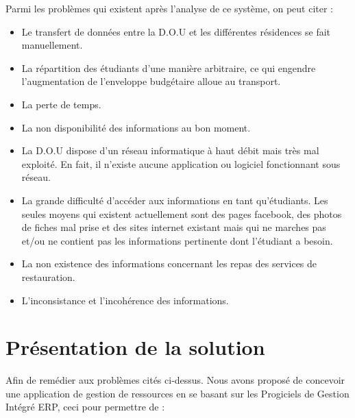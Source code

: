 Parmi les problèmes qui existent après l’analyse de ce système, on peut citer :
    \begin{itemize}
        \item Le transfert de données entre la \acs{D.O.U} et les différentes résidences se fait manuellement.
        \item La répartition des étudiants d’une manière arbitraire, ce qui engendre l’augmentation de l’enveloppe budgétaire alloue au transport.
        \item La perte de temps.
        \item La non disponibilité des informations au bon moment.
        \item La \acs{D.O.U} dispose d'un réseau informatique à haut débit mais très mal exploité. En fait, il n'existe aucune application ou logiciel fonctionnant sous réseau.
        \item La grande difficulté d'accéder aux informations en tant qu'étudiants. Les seules moyens qui existent actuellement sont des pages facebook, des photos de fiches mal prise et des sites internet existant mais qui ne marches pas et/ou ne contient pas les informations pertinente dont l'étudiant a besoin.
        \item La non existence des informations concernant les repas des services de restauration.
        \item L'inconsistance et l'incohérence des informations.\\
    \end{itemize}

\section{Présentation de la solution}
    Afin de remédier aux problèmes cités ci-dessus. Nous avons proposé de concevoir une application de gestion de ressources en se basant sur les Progiciels de Gestion Intégré \acs{ERP}, ceci pour permettre de :\\

